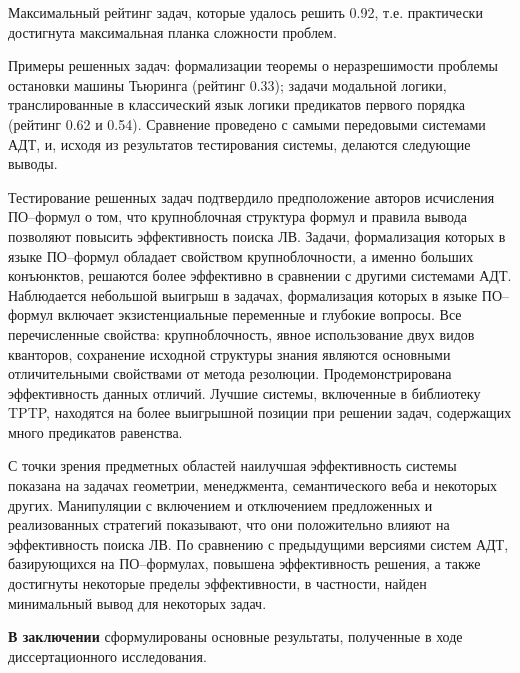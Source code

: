 \documentclass[a4paper]{report}
\begin{document}
Максимальный рейтинг задач, которые удалось решить 0.92, т.е. практически достигнута максимальная планка сложности проблем.

Примеры решенных задач: формализации теоремы о неразрешимости проблемы остановки машины Тьюринга (рейтинг 0.33); задачи модальной логики, транслированные в классический язык логики предикатов первого порядка (рейтинг 0.62 и 0.54). Сравнение проведено с самыми передовыми системами АДТ, и, исходя из результатов тестирования системы, делаются следующие выводы.

Тестирование решенных задач подтвердило предположение авторов исчисления ПО--формул о том, что крупноблочная структура формул и правила вывода позволяют повысить эффективность поиска ЛВ. Задачи, формализация которых в языке ПО--формул обладает свойством крупноблочности, а именно больших конъюнктов, решаются более эффективно в сравнении с другими системами АДТ. Наблюдается небольшой выигрыш в задачах, формализация которых в языке ПО--формул включает экзистенциальные переменные и глубокие вопросы. Все перечисленные свойства: крупноблочность, явное использование двух видов кванторов, сохранение исходной структуры знания являются основными отличительными свойствами от метода резолюции. Продемонстрирована эффективность данных отличий. Лучшие системы, включенные в библиотеку TPTP, находятся на более выигрышной позиции при решении задач, содержащих много предикатов равенства.

С точки зрения предметных областей наилучшая эффективность системы показана на задачах геометрии, менеджмента, семантического веба и некоторых других. Манипуляции с включением и отключением предложенных и реализованных стратегий показывают, что они положительно влияют на эффективность поиска ЛВ. По сравнению с предыдущими версиями систем АДТ, базирующихся на ПО--формулах, повышена эффективность решения, а также достигнуты некоторые пределы эффективности, в частности, найден минимальный вывод для некоторых задач.



\textbf{В заключении} сформулированы основные результаты, полученные в ходе диссертационного исследования.
\end{document}
